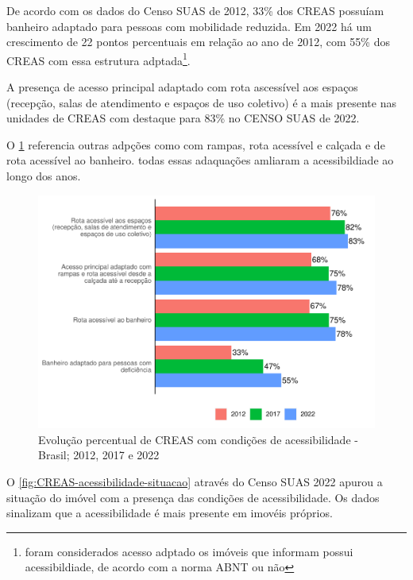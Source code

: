 \documentclass[
  brazilian]{report}
\begin{document}
De acordo com os dados do Censo SUAS de 2012, 33\% dos CREAS possuíam
banheiro adaptado para pessoas com mobilidade reduzida. Em 2022 há um
crescimento de 22 pontos percentuais em relação ao ano de 2012, com 55\%
dos CREAS com essa estrutura
adptada\footnote{foram considerados acesso adptado os imóveis que informam possui acessibildiade, de acordo com a norma ABNT ou não}.

A presença de acesso principal adaptado com rota ascessível aos espaços
(recepção, salas de atendimento e espaços de uso coletivo) é a mais
presente nas unidades de CREAS com destaque para 83\% no CENSO SUAS de
2022.

O \cref{fig:creas-acessibilidade} referencia outras adpções como com
rampas, rota acessível e calçada e de rota acessível ao banheiro. todas
essas adaquações amliaram a acessibildiade ao longo dos anos.

\begin{figure}
\includegraphics{Censo-SUAS-2022_files/figure-latex/creas-acessibilidade-1} \caption[Evolução percentual de CREAS com condições de acessibilidade - Brasil]{Evolução percentual de CREAS com condições de acessibilidade - Brasil; 2012, 2017 e 2022}\label{fig:creas-acessibilidade}
\end{figure}

O \cref{fig:CREAS-acessibilidade-situacao} através do Censo SUAS 2022
apurou a situação do imóvel com a presença das condições de
acessibilidade. Os dados sinalizam que a acessibilidade é mais presente
em imovéis próprios.
\end{document}
